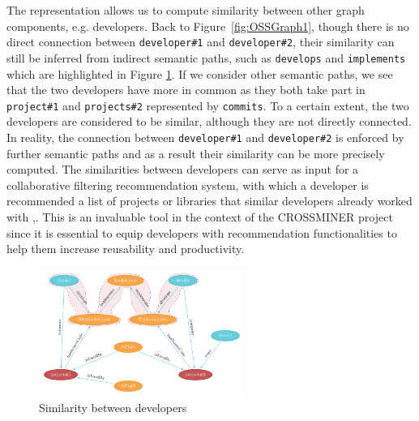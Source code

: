 The representation allows us to compute similarity between other graph components, e.g. developers. Back to Figure~\ref{fig:OSSGraph1}, though there is no direct connection between \texttt{developer\#1} and \texttt{developer\#2}, their similarity can still be inferred from indirect semantic paths, such as \texttt{develops} and \texttt{implements} which are highlighted in Figure \ref{fig:OSSGraph4}.
%
If we consider other semantic paths, we see that the two developers have more in common as they both take part in \texttt{project\#1} and \texttt{projects\#2} represented by \texttt{commits}. To a certain extent, the two developers are considered to be similar, although they are not directly connected. In reality, the connection between \texttt{developer\#1} and \texttt{developer\#2} is enforced by further semantic paths and as a result their similarity can be more precisely computed. The similarities between developers can serve as input for a collaborative filtering recommendation system, with which a developer is recommended a list of projects or libraries that similar developers already worked with \cite{Pazzani2007},\cite{Schafer:2007:CFR:1768197.1768208}. This is an invaluable tool in the context of the CROSSMINER project since it is essential to equip developers with recommendation functionalities to help them increase reusability and productivity.


\begin{figure}[t!]
	\centering
	\includegraphics[width=0.60\textwidth]{images/OSSGraph4.pdf}
	\caption{Similarity between developers}
	\label{fig:OSSGraph4}
\end{figure}
\clearpage

